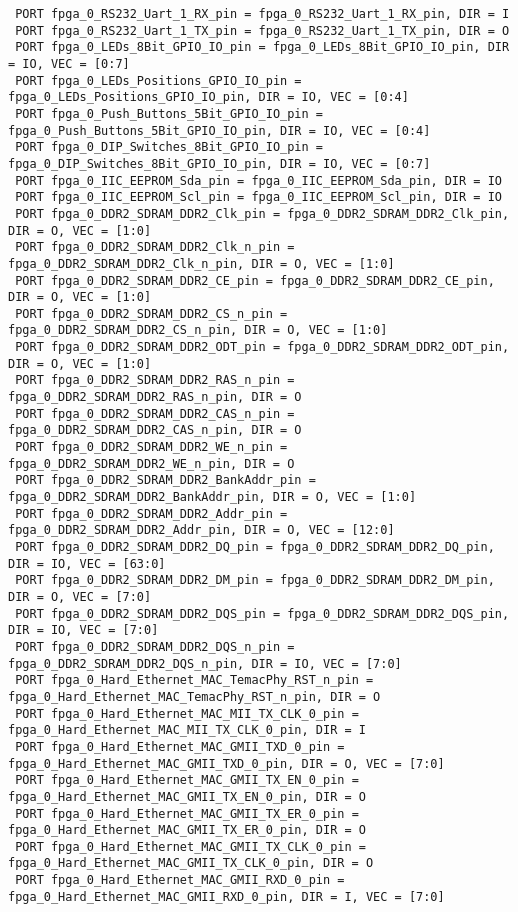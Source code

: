 \begin{verbatim}
 PORT fpga_0_RS232_Uart_1_RX_pin = fpga_0_RS232_Uart_1_RX_pin, DIR = I
 PORT fpga_0_RS232_Uart_1_TX_pin = fpga_0_RS232_Uart_1_TX_pin, DIR = O
 PORT fpga_0_LEDs_8Bit_GPIO_IO_pin = fpga_0_LEDs_8Bit_GPIO_IO_pin, DIR = IO, VEC = [0:7]
 PORT fpga_0_LEDs_Positions_GPIO_IO_pin = fpga_0_LEDs_Positions_GPIO_IO_pin, DIR = IO, VEC = [0:4]
 PORT fpga_0_Push_Buttons_5Bit_GPIO_IO_pin = fpga_0_Push_Buttons_5Bit_GPIO_IO_pin, DIR = IO, VEC = [0:4]
 PORT fpga_0_DIP_Switches_8Bit_GPIO_IO_pin = fpga_0_DIP_Switches_8Bit_GPIO_IO_pin, DIR = IO, VEC = [0:7]
 PORT fpga_0_IIC_EEPROM_Sda_pin = fpga_0_IIC_EEPROM_Sda_pin, DIR = IO
 PORT fpga_0_IIC_EEPROM_Scl_pin = fpga_0_IIC_EEPROM_Scl_pin, DIR = IO
 PORT fpga_0_DDR2_SDRAM_DDR2_Clk_pin = fpga_0_DDR2_SDRAM_DDR2_Clk_pin, DIR = O, VEC = [1:0]
 PORT fpga_0_DDR2_SDRAM_DDR2_Clk_n_pin = fpga_0_DDR2_SDRAM_DDR2_Clk_n_pin, DIR = O, VEC = [1:0]
 PORT fpga_0_DDR2_SDRAM_DDR2_CE_pin = fpga_0_DDR2_SDRAM_DDR2_CE_pin, DIR = O, VEC = [1:0]
 PORT fpga_0_DDR2_SDRAM_DDR2_CS_n_pin = fpga_0_DDR2_SDRAM_DDR2_CS_n_pin, DIR = O, VEC = [1:0]
 PORT fpga_0_DDR2_SDRAM_DDR2_ODT_pin = fpga_0_DDR2_SDRAM_DDR2_ODT_pin, DIR = O, VEC = [1:0]
 PORT fpga_0_DDR2_SDRAM_DDR2_RAS_n_pin = fpga_0_DDR2_SDRAM_DDR2_RAS_n_pin, DIR = O
 PORT fpga_0_DDR2_SDRAM_DDR2_CAS_n_pin = fpga_0_DDR2_SDRAM_DDR2_CAS_n_pin, DIR = O
 PORT fpga_0_DDR2_SDRAM_DDR2_WE_n_pin = fpga_0_DDR2_SDRAM_DDR2_WE_n_pin, DIR = O
 PORT fpga_0_DDR2_SDRAM_DDR2_BankAddr_pin = fpga_0_DDR2_SDRAM_DDR2_BankAddr_pin, DIR = O, VEC = [1:0]
 PORT fpga_0_DDR2_SDRAM_DDR2_Addr_pin = fpga_0_DDR2_SDRAM_DDR2_Addr_pin, DIR = O, VEC = [12:0]
 PORT fpga_0_DDR2_SDRAM_DDR2_DQ_pin = fpga_0_DDR2_SDRAM_DDR2_DQ_pin, DIR = IO, VEC = [63:0]
 PORT fpga_0_DDR2_SDRAM_DDR2_DM_pin = fpga_0_DDR2_SDRAM_DDR2_DM_pin, DIR = O, VEC = [7:0]
 PORT fpga_0_DDR2_SDRAM_DDR2_DQS_pin = fpga_0_DDR2_SDRAM_DDR2_DQS_pin, DIR = IO, VEC = [7:0]
 PORT fpga_0_DDR2_SDRAM_DDR2_DQS_n_pin = fpga_0_DDR2_SDRAM_DDR2_DQS_n_pin, DIR = IO, VEC = [7:0]
 PORT fpga_0_Hard_Ethernet_MAC_TemacPhy_RST_n_pin = fpga_0_Hard_Ethernet_MAC_TemacPhy_RST_n_pin, DIR = O
 PORT fpga_0_Hard_Ethernet_MAC_MII_TX_CLK_0_pin = fpga_0_Hard_Ethernet_MAC_MII_TX_CLK_0_pin, DIR = I
 PORT fpga_0_Hard_Ethernet_MAC_GMII_TXD_0_pin = fpga_0_Hard_Ethernet_MAC_GMII_TXD_0_pin, DIR = O, VEC = [7:0]
 PORT fpga_0_Hard_Ethernet_MAC_GMII_TX_EN_0_pin = fpga_0_Hard_Ethernet_MAC_GMII_TX_EN_0_pin, DIR = O
 PORT fpga_0_Hard_Ethernet_MAC_GMII_TX_ER_0_pin = fpga_0_Hard_Ethernet_MAC_GMII_TX_ER_0_pin, DIR = O
 PORT fpga_0_Hard_Ethernet_MAC_GMII_TX_CLK_0_pin = fpga_0_Hard_Ethernet_MAC_GMII_TX_CLK_0_pin, DIR = O
 PORT fpga_0_Hard_Ethernet_MAC_GMII_RXD_0_pin = fpga_0_Hard_Ethernet_MAC_GMII_RXD_0_pin, DIR = I, VEC = [7:0]

\end{verbatim}
